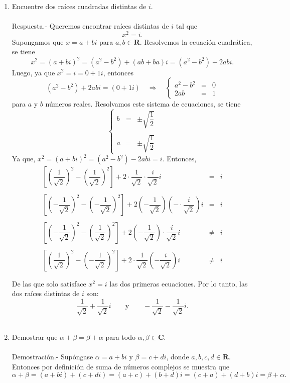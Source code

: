 \begin{enumerate}[\bfseries 1.]
    \item Encuentre dos raíces cuadradas distintas de $i$.\\\\
	Respuesta.-\; Queremos encontrar raíces distintas de $i$ tal que
	$$x^2=i.$$
	Supongamos que $x=a+bi$ para $a,b\in \textbf{R}$. Resolvemos la ecuación cuadrática, se tiene 
	$$x^2=(a+bi)^2=(a^2-b^2)+(ab+ba)i=(a^2-b^2)+2abi.$$
	Luego, ya que $x^2=i=0+1i$, entonces
	$$(a^2-b^2)+2abi=(0+1i)\quad \Rightarrow \quad \left\{\begin{array}{rcl}
		a^2-b^2&=&0\\
		2ab&=&1
	    \end{array}\right.$$
	para $a$ y $b$ números reales. Resolvamos este sistema de ecuaciones, se tiene 
	$$\left\{\begin{array}{rcl}
		b&=&\pm \sqrt{\dfrac{1}{2}}\\\\
		a&=&\pm \sqrt{\dfrac{1}{2}}
	\end{array}\right.$$
	Ya que, $x^2=(a+bi)^2=(a^2-b^2)-2abi=i$. Entonces, 
	$$\begin{array}{rcl}
	    \left[\left(\dfrac{1}{\sqrt{2}}\right)^2-\left(\dfrac{1}{\sqrt{2}}\right)^2\right]+2\cdot\dfrac{1}{\sqrt{2}}\cdot\dfrac{i}{\sqrt{2}}i&=&i\\\\
	    \left[\left(-\dfrac{1}{\sqrt{2}}\right)^2-\left(-\dfrac{1}{\sqrt{2}}\right)^2\right]+2\left(-\dfrac{1}{\sqrt{2}}\right)\left(-\cdot\dfrac{i}{\sqrt{2}}\right)i&=&i\\\\
	    \left[\left(-\dfrac{1}{\sqrt{2}}\right)^2-\left(\dfrac{1}{\sqrt{2}}\right)^2\right]+2\left(-\dfrac{1}{\sqrt{2}}\right)\cdot\dfrac{i}{\sqrt{2}}i&\neq&i\\\\
	    \left[\left(\dfrac{1}{\sqrt{2}}\right)^2-\left(-\dfrac{1}{\sqrt{2}}\right)^2\right]+2\cdot \dfrac{1}{\sqrt{2}}\left(-\dfrac{i}{\sqrt{2}}\right)i&\neq&i\\\\
	\end{array}$$
	De las que solo satisface $x^2=i$ las dos primeras ecuaciones. Por lo tanto, las dos raíces distintas de $i$ son:
	$$\dfrac{1}{\sqrt{2}}+\dfrac{1}{\sqrt{2}}i\qquad \mbox{y}\qquad -\dfrac{1}{\sqrt{2}}-\dfrac{1}{\sqrt{2}}i.$$\\



    \item Demostrar que $\alpha+\beta=\beta+\alpha$ para todo $\alpha,\beta\in \textbf{C}$.\\\\
	Demostración.-\;  Supóngase $\alpha=a+bi$ y $\beta=c+di$, donde $a,b,c,d \in \textbf{R}$. Entonces por definición de suma de números complejos se muestra que
	$$\alpha + \beta = (a+bi) + (c+di) = (a+c) + (b+d)i = (c+a) + (d+b)i = \beta + \alpha.$$\\



\end{enumerate}
